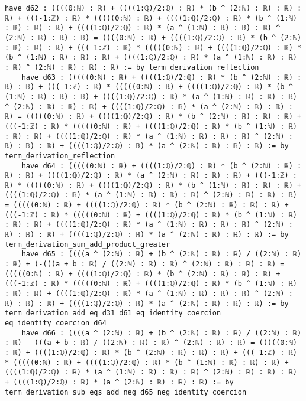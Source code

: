 \documentclass{article}
\begin{document}
\begin{tcolorbox}[colback=white!10, width=\linewidth]
\begin{lstlisting}[language=Lean4]
    have d62 : ((((0:ℕ) : ℝ) + ((((1:ℚ)/2:ℚ) : ℝ) * (b ^ (2:ℕ) : ℝ) : ℝ) : ℝ) + (((-1:ℤ) : ℝ) * (((((0:ℕ) : ℝ) + ((((1:ℚ)/2:ℚ) : ℝ) * (b ^ (1:ℕ) : ℝ) : ℝ) : ℝ) + ((((1:ℚ)/2:ℚ) : ℝ) * (a ^ (1:ℕ) : ℝ) : ℝ) : ℝ) ^ (2:ℕ) : ℝ) : ℝ) : ℝ) = ((((0:ℕ) : ℝ) + ((((1:ℚ)/2:ℚ) : ℝ) * (b ^ (2:ℕ) : ℝ) : ℝ) : ℝ) + (((-1:ℤ) : ℝ) * (((((0:ℕ) : ℝ) + ((((1:ℚ)/2:ℚ) : ℝ) * (b ^ (1:ℕ) : ℝ) : ℝ) : ℝ) + ((((1:ℚ)/2:ℚ) : ℝ) * (a ^ (1:ℕ) : ℝ) : ℝ) : ℝ) ^ (2:ℕ) : ℝ) : ℝ) : ℝ) := by term_derivation_reflection
    have d63 : (((((0:ℕ) : ℝ) + ((((1:ℚ)/2:ℚ) : ℝ) * (b ^ (2:ℕ) : ℝ) : ℝ) : ℝ) + (((-1:ℤ) : ℝ) * (((((0:ℕ) : ℝ) + ((((1:ℚ)/2:ℚ) : ℝ) * (b ^ (1:ℕ) : ℝ) : ℝ) : ℝ) + ((((1:ℚ)/2:ℚ) : ℝ) * (a ^ (1:ℕ) : ℝ) : ℝ) : ℝ) ^ (2:ℕ) : ℝ) : ℝ) : ℝ) + ((((1:ℚ)/2:ℚ) : ℝ) * (a ^ (2:ℕ) : ℝ) : ℝ) : ℝ) = (((((0:ℕ) : ℝ) + ((((1:ℚ)/2:ℚ) : ℝ) * (b ^ (2:ℕ) : ℝ) : ℝ) : ℝ) + (((-1:ℤ) : ℝ) * (((((0:ℕ) : ℝ) + ((((1:ℚ)/2:ℚ) : ℝ) * (b ^ (1:ℕ) : ℝ) : ℝ) : ℝ) + ((((1:ℚ)/2:ℚ) : ℝ) * (a ^ (1:ℕ) : ℝ) : ℝ) : ℝ) ^ (2:ℕ) : ℝ) : ℝ) : ℝ) + ((((1:ℚ)/2:ℚ) : ℝ) * (a ^ (2:ℕ) : ℝ) : ℝ) : ℝ) := by term_derivation_reflection
    have d64 : (((((0:ℕ) : ℝ) + ((((1:ℚ)/2:ℚ) : ℝ) * (b ^ (2:ℕ) : ℝ) : ℝ) : ℝ) + ((((1:ℚ)/2:ℚ) : ℝ) * (a ^ (2:ℕ) : ℝ) : ℝ) : ℝ) + (((-1:ℤ) : ℝ) * (((((0:ℕ) : ℝ) + ((((1:ℚ)/2:ℚ) : ℝ) * (b ^ (1:ℕ) : ℝ) : ℝ) : ℝ) + ((((1:ℚ)/2:ℚ) : ℝ) * (a ^ (1:ℕ) : ℝ) : ℝ) : ℝ) ^ (2:ℕ) : ℝ) : ℝ) : ℝ) = (((((0:ℕ) : ℝ) + ((((1:ℚ)/2:ℚ) : ℝ) * (b ^ (2:ℕ) : ℝ) : ℝ) : ℝ) + (((-1:ℤ) : ℝ) * (((((0:ℕ) : ℝ) + ((((1:ℚ)/2:ℚ) : ℝ) * (b ^ (1:ℕ) : ℝ) : ℝ) : ℝ) + ((((1:ℚ)/2:ℚ) : ℝ) * (a ^ (1:ℕ) : ℝ) : ℝ) : ℝ) ^ (2:ℕ) : ℝ) : ℝ) : ℝ) + ((((1:ℚ)/2:ℚ) : ℝ) * (a ^ (2:ℕ) : ℝ) : ℝ) : ℝ) := by term_derivation_sum_add_product_greater
    have d65 : ((((a ^ (2:ℕ) : ℝ) + (b ^ (2:ℕ) : ℝ) : ℝ) / ((2:ℕ) : ℝ) : ℝ) + (-(((a + b : ℝ) / ((2:ℕ) : ℝ) : ℝ) ^ (2:ℕ) : ℝ) : ℝ) : ℝ) = (((((0:ℕ) : ℝ) + ((((1:ℚ)/2:ℚ) : ℝ) * (b ^ (2:ℕ) : ℝ) : ℝ) : ℝ) + (((-1:ℤ) : ℝ) * (((((0:ℕ) : ℝ) + ((((1:ℚ)/2:ℚ) : ℝ) * (b ^ (1:ℕ) : ℝ) : ℝ) : ℝ) + ((((1:ℚ)/2:ℚ) : ℝ) * (a ^ (1:ℕ) : ℝ) : ℝ) : ℝ) ^ (2:ℕ) : ℝ) : ℝ) : ℝ) + ((((1:ℚ)/2:ℚ) : ℝ) * (a ^ (2:ℕ) : ℝ) : ℝ) : ℝ) := by term_derivation_add_eq d31 d61 eq_identity_coercion eq_identity_coercion d64
    have d66 : ((((a ^ (2:ℕ) : ℝ) + (b ^ (2:ℕ) : ℝ) : ℝ) / ((2:ℕ) : ℝ) : ℝ) - (((a + b : ℝ) / ((2:ℕ) : ℝ) : ℝ) ^ (2:ℕ) : ℝ) : ℝ) = (((((0:ℕ) : ℝ) + ((((1:ℚ)/2:ℚ) : ℝ) * (b ^ (2:ℕ) : ℝ) : ℝ) : ℝ) + (((-1:ℤ) : ℝ) * (((((0:ℕ) : ℝ) + ((((1:ℚ)/2:ℚ) : ℝ) * (b ^ (1:ℕ) : ℝ) : ℝ) : ℝ) + ((((1:ℚ)/2:ℚ) : ℝ) * (a ^ (1:ℕ) : ℝ) : ℝ) : ℝ) ^ (2:ℕ) : ℝ) : ℝ) : ℝ) + ((((1:ℚ)/2:ℚ) : ℝ) * (a ^ (2:ℕ) : ℝ) : ℝ) : ℝ) := by term_derivation_sub_eqs_add_neg d65 neg_identity_coercion

\end{lstlisting}
\end{tcolorbox}
\end{document}
